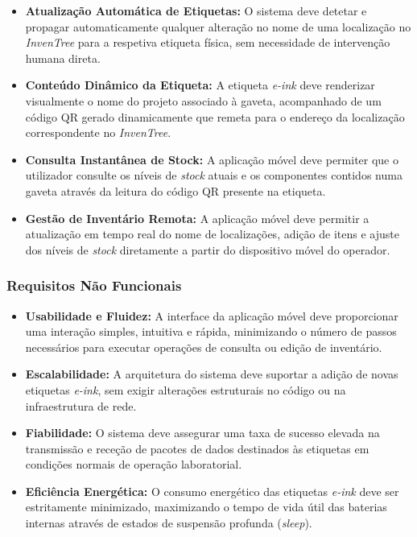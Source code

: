 \documentclass[10pt]{article}
\begin{document}
\begin{itemize}
    \item \textbf{Atualização Automática de Etiquetas:} O sistema deve detetar e propagar automaticamente qualquer alteração no nome de uma localização no \textit{InvenTree} para a respetiva etiqueta física, sem necessidade de intervenção humana direta.
    \item \textbf{Conteúdo Dinâmico da Etiqueta:} A etiqueta \textit{e-ink} deve renderizar visualmente o nome do projeto associado à gaveta, acompanhado de um código QR gerado dinamicamente que remeta para o endereço da localização correspondente no \textit{InvenTree}.
    \item \textbf{Consulta Instantânea de Stock:} A aplicação móvel deve permiter que o utilizador consulte os níveis de \textit{stock} atuais e os componentes contidos numa gaveta através da leitura do código QR presente na etiqueta.
    \item \textbf{Gestão de Inventário Remota:} A aplicação móvel deve permitir a atualização em tempo real do nome de localizações, adição de itens e ajuste dos níveis de \textit{stock} diretamente a partir do dispositivo móvel do operador.
\end{itemize}

\subsubsection*{Requisitos Não Funcionais}
\begin{itemize}
    \item \textbf{Usabilidade e Fluidez:} A interface da aplicação móvel deve proporcionar uma interação simples, intuitiva e rápida, minimizando o número de passos necessários para executar operações de consulta ou edição de inventário.
    \item \textbf{Escalabilidade:} A arquitetura do sistema deve suportar a adição de novas etiquetas \textit{e-ink}, sem exigir alterações estruturais no código ou na infraestrutura de rede.
    \item \textbf{Fiabilidade:} O sistema deve assegurar uma taxa de sucesso elevada na transmissão e receção de pacotes de dados destinados às etiquetas em condições normais de operação laboratorial.
    \item \textbf{Eficiência Energética:} O consumo energético das etiquetas \textit{e-ink} deve ser estritamente minimizado, maximizando o tempo de vida útil das baterias internas através de estados de suspensão profunda (\textit{sleep}).
\end{itemize}
\end{document}
